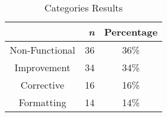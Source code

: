 \begin{table}[H]
\centering
\caption{\SUGGS Categories Results}
\begin{tabular}{ |c|r|c|} \hline
   & \textbf{\textit{n}} & \textbf{Percentage} \\ \hline
 Non-Functional &  36 & 36\% \\ \hline
 Improvement & 34  & 34\% \\ \hline 
 Corrective &  16 & 16\% \\ \hline
 Formatting & 14 & 14\% \\ \hline
\end{tabular}
\label{tab:sugg-categories}
\end{table}